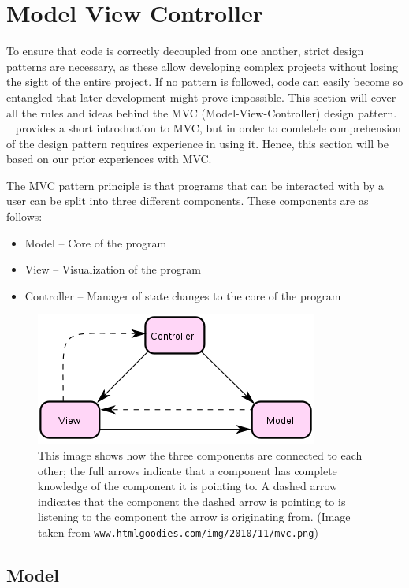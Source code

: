 
\section{Model View Controller}

To ensure that code is correctly decoupled from one another, strict
design patterns are necessary, as these allow developing complex projects
without losing the sight of the entire project. If no pattern is followed,
code can easily become so entangled that later development might prove
impossible. This section will cover all the rules and ideas behind
the MVC (Model-View-Controller) design pattern. ~\cite{WikiMVC} provides
a short introduction to MVC, but in order to comletele comprehension
of the design pattern requires experience in using it. Hence, this
section will be based on our prior experiences with MVC.

The MVC pattern principle is that programs that can be interacted
with by a user can be split into three different components. These
components are as follows:
\begin{itemize}
\item Model -- Core of the program
\item View -- Visualization of the program
\item Controller -- Manager of state changes to the core of the program
\end{itemize}
\begin{figure}
\centering{}\includegraphics{MVC}\caption{\label{fig:MVCBasic}This image shows how the three components are
connected to each other; the full arrows indicate that a component
has complete knowledge of the component it is pointing to. A dashed
arrow indicates that the component the dashed arrow is pointing to
is listening to the component the arrow is originating from. (Image
taken from \texttt{www.htmlgoodies.com/img/2010/11/mvc.png})}
\end{figure}



\subsection{Model}

